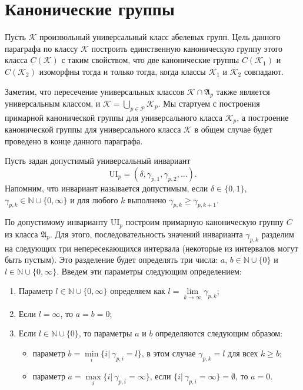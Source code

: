 \documentclass[a4paper,11pt,twoside]{article}
\def\A{{\mathfrak{A}}}
\def\K{{\mathcal{K}}}
\def\P{{\mathcal{P}}}
\def\N{{\mathbb{N}}}
\def\ui{{\mathrm{UI}}}
\begin{document}
\section{Канонические группы}\label{sec:CannonicalGroups}

Пусть $\K$ произвольный универсальный класс абелевых групп. Цель данного параграфа по классу $\K$ построить единственную каноническую группу этого класса $C(\K)$ с таким свойством, что две канонические группы $C(\K_1)$ и $C(\K_2)$ изоморфны тогда и только тогда, когда классы $\K_1$ и $\K_2$ совпадают.

Заметим, что пересечение универсальных классов $\K \cap \A_p$ также является универсальным классом, и $\K = \bigcup\limits_{p \in \P} \K_p$. Мы стартуем с построения примарной канонической группы для универсального класса $\K_p$, а построение канонической группы для универсального класса $\K$ в общем случае будет проведено в конце данного параграфа.

Пусть задан допустимый универсальный инвариант 
$$\ui_p = (\delta, \gamma_{p,1}, \gamma_{p,2}, \ldots).$$
Напомним, что инвариант называется допустимым, если $\delta \in \{0,1\}$, $\gamma_{p,k} \in \N \cup \{0, \infty\}$ и для любого $k$ выполнено $\gamma_{p,k} \geq \gamma_{p, k+1}$.

По допустимому инварианту $\ui_p$ построим примарную каноническую группу $C$ из класса $\A_p$. Для этого, последовательность значений инварианта $\gamma_{p,k}$ разделим на следующих три непересекающихся интервала (некоторые из интервалов могут быть пустым). Это разделение будет определять три числа: $a$, $b \in \N \cup \{0\}$ и $l \in \N \cup \{0, \infty\}$. Введем эти параметры следующим определением:
\begin{enumerate}
\item Параметр $l \in \N \cup \{0, \infty\}$ определяем как $l = \lim\limits_{k \rightarrow \infty} \gamma_{p,k}$;
\item Если $l = \infty$, то $a = b = 0$;
\item Если $l \in \N \cup \{0\}$, то параметры $a$ и $b$ определяются следующим образом:
\begin{itemize}
\item параметр $b = \min\limits_{i} \{ i | \ \gamma_{p,i} = l\}$, в этом случае $\gamma_{p,k} = l$ для всех $k \geq b$;
\item параметр $a = \max\limits_{i} \{i | \ \gamma_{p,i} = \infty\}$, если $\{i | \ \gamma_{p,i} = \infty\} = \emptyset$, то $a = 0$.
\end{itemize}
\end{enumerate}
\end{document}
